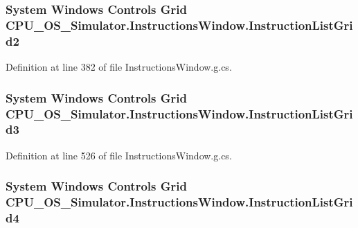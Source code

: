 \subsubsection[{Instruction\+List\+Grid2}]{\setlength{\rightskip}{0pt plus 5cm}System Windows Controls Grid C\+P\+U\+\_\+\+O\+S\+\_\+\+Simulator.\+Instructions\+Window.\+Instruction\+List\+Grid2\hspace{0.3cm}{\ttfamily [package]}}\label{class_c_p_u___o_s___simulator_1_1_instructions_window_a33108da9779c5108fc5dd303a8d33454}


Definition at line 382 of file Instructions\+Window.\+g.\+cs.

\hypertarget{class_c_p_u___o_s___simulator_1_1_instructions_window_a3cc76cf3ae5c4155d0e30727eb357d12}{}
\subsubsection[{Instruction\+List\+Grid3}]{\setlength{\rightskip}{0pt plus 5cm}System Windows Controls Grid C\+P\+U\+\_\+\+O\+S\+\_\+\+Simulator.\+Instructions\+Window.\+Instruction\+List\+Grid3\hspace{0.3cm}{\ttfamily [package]}}\label{class_c_p_u___o_s___simulator_1_1_instructions_window_a3cc76cf3ae5c4155d0e30727eb357d12}


Definition at line 526 of file Instructions\+Window.\+g.\+cs.

\hypertarget{class_c_p_u___o_s___simulator_1_1_instructions_window_a9cdd58a2e38d3f0b047b6eb64b43ea03}{}
\subsubsection[{Instruction\+List\+Grid4}]{\setlength{\rightskip}{0pt plus 5cm}System Windows Controls Grid C\+P\+U\+\_\+\+O\+S\+\_\+\+Simulator.\+Instructions\+Window.\+Instruction\+List\+Grid4\hspace{0.3cm}{\ttfamily [package]}}\label{class_c_p_u___o_s___simulator_1_1_instructions_window_a9cdd58a2e38d3f0b047b6eb64b43ea03}


